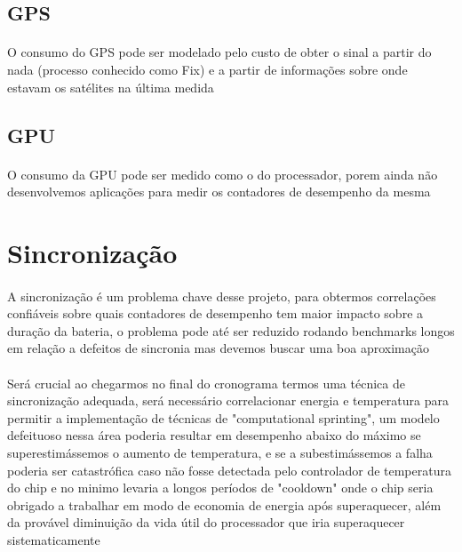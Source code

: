\documentclass[11pt,a4paper,titlepage]{article}
\begin{document}
\subsection{GPS}
\paragraph{} O consumo do GPS pode ser modelado pelo custo de obter o sinal a partir do nada (processo conhecido como Fix) e a partir de informações sobre onde estavam os satélites na última medida
\subsection{GPU}
\paragraph{} O consumo da GPU pode ser medido como o do processador, porem ainda não desenvolvemos aplicações para medir os contadores de desempenho da mesma
\section{Sincronização}
\paragraph{} A sincronização é um problema chave desse projeto, para obtermos correlações confiáveis sobre quais contadores de desempenho tem maior impacto sobre a duração da bateria, o problema pode até ser reduzido rodando benchmarks longos em relação a defeitos de sincronia mas devemos buscar uma boa aproximação
\paragraph{} Será crucial ao chegarmos no final do cronograma termos uma técnica de sincronização adequada, será necessário correlacionar energia e temperatura para permitir a implementação de técnicas de "computational sprinting", um modelo defeituoso nessa área poderia resultar em desempenho abaixo do máximo se superestimássemos o aumento de temperatura, e se a subestimássemos a falha poderia ser catastrófica caso não fosse detectada pelo controlador de temperatura do chip e no minimo levaria a longos períodos de "cooldown" onde o chip seria obrigado a trabalhar em modo de economia de energia após  superaquecer, além da provável diminuição da vida útil do processador que iria superaquecer sistematicamente
\end{document}
